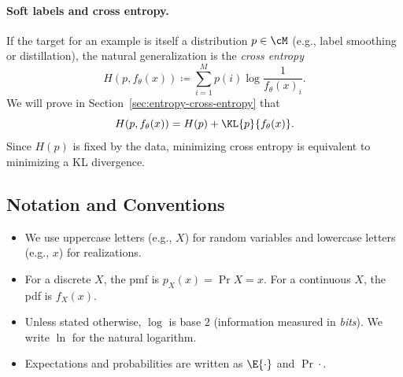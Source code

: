 \paragraph{Soft labels and cross entropy.}
If the target for an example is itself a distribution $p\in\cM$ (e.g., label smoothing or distillation), the natural generalization is the \emph{cross entropy}
\begin{equation}
    H(p,f_\theta(x)) \coloneqq \sum_{i=1}^M p(i)\log\frac{1}{f_\theta(x)_i}.
\end{equation}
We will prove in Section~\ref{sec:entropy-cross-entropy} that
\begin{equation}
    H(p,f_\theta(x)) = H(p) + \KL{p}{f_\theta(x)}.
\end{equation}
Since $H(p)$ is fixed by the data, minimizing cross entropy is equivalent to minimizing a KL divergence.

\subsection{Notation and Conventions}
\label{subsec:notation}

\begin{itemize}[leftmargin=2em]
    \item We use uppercase letters (e.g., $X$) for random variables and lowercase letters (e.g., $x$) for realizations.

    \item For a discrete $X$, the pmf is $p_X(x)=\Pr{X=x}$. For a continuous $X$, the pdf is $f_X(x)$.

    \item Unless stated otherwise, $\log$ is base $2$ (information measured in \emph{bits}). We write $\ln$ for the natural logarithm.

    \item Expectations and probabilities are written as $\E{\cdot}$ and $\Pr{\cdot}$.
\end{itemize}
